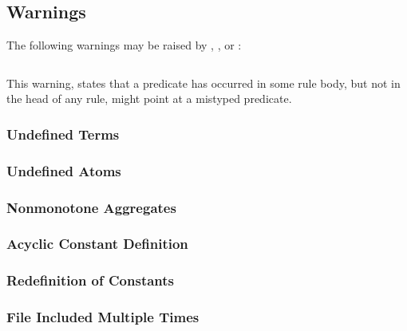 \subsection{Warnings}\label{subsec:warn}

The following warnings may be raised by \gringo, \clingo, or \iclingo:
%
\begin{lstlisting}[numbers=none,escapechar=@]
% warning: @\textit{p}@/@\!\textit{i}@ is never defined
\end{lstlisting}
%
This warning, states that a predicate 
has occurred in some rule body, but not in the head of any rule,
might point at a mistyped predicate.

\subsubsection{Undefined Terms}\label{sec:warn:undefterm}
\tbf

\subsubsection{Undefined Atoms}\label{sec:warn:undefatm}
\tbf

\subsubsection{Nonmonotone Aggregates}\label{sec:warn:nonmon}
\tbf

\subsubsection{Acyclic Constant Definition}\label{sec:warn:cycdef}
\tbf

\subsubsection{Redefinition of Constants}\label{sec:warn:redef}
\tbf

\subsubsection{File Included Multiple Times}\label{sec:warn:incfile}
\tbf


